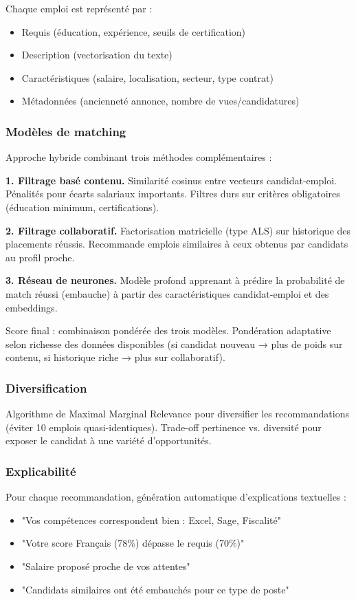 \documentclass[12pt]{article}
\begin{document}
Chaque emploi est représenté par :
\begin{itemize}
    \item Requis (éducation, expérience, seuils de certification)
    \item Description (vectorisation du texte)
    \item Caractéristiques (salaire, localisation, secteur, type contrat)
    \item Métadonnées (ancienneté annonce, nombre de vues/candidatures)
\end{itemize}

\subsubsection{Modèles de matching}

Approche hybride combinant trois méthodes complémentaires :

\textbf{1. Filtrage basé contenu.} Similarité cosinus entre vecteurs candidat-emploi. Pénalités pour écarts salariaux importants. Filtres durs sur critères obligatoires (éducation minimum, certifications).

\textbf{2. Filtrage collaboratif.} Factorisation matricielle (type ALS) sur historique des placements réussis. Recommande emplois similaires à ceux obtenus par candidats au profil proche.

\textbf{3. Réseau de neurones.} Modèle profond apprenant à prédire la probabilité de match réussi (embauche) à partir des caractéristiques candidat-emploi et des embeddings.

Score final : combinaison pondérée des trois modèles. Pondération adaptative selon richesse des données disponibles (si candidat nouveau → plus de poids sur contenu, si historique riche → plus sur collaboratif).

\subsubsection{Diversification}

Algorithme de Maximal Marginal Relevance pour diversifier les recommandations (éviter 10 emplois quasi-identiques). Trade-off pertinence vs. diversité pour exposer le candidat à une variété d'opportunités.

\subsubsection{Explicabilité}

Pour chaque recommandation, génération automatique d'explications textuelles :
\begin{itemize}
    \item "Vos compétences correspondent bien : Excel, Sage, Fiscalité"
    \item "Votre score Français (78\%) dépasse le requis (70\%)"
    \item "Salaire proposé proche de vos attentes"
    \item "Candidats similaires ont été embauchés pour ce type de poste"
\end{itemize}
\end{document}

